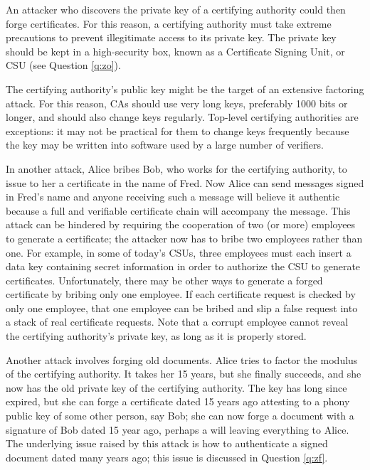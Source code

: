 An attacker who discovers the private key of a certifying authority could 
then forge certificates. For this reason, a certifying authority must take 
extreme precautions to prevent illegitimate access to its private key. The 
private key should be kept in a high-security box, known as a Certificate 
Signing Unit, or CSU (see Question \ref{q:zo}).

The certifying authority's public key might be the target of an extensive 
factoring attack. For this reason, CAs should use very long keys, preferably 
1000 bits or longer, and should also change keys regularly. Top-level 
certifying authorities are exceptions: it may not be practical for them to 
change keys frequently because the key may be written into software used 
by a large number of verifiers.

In another attack, Alice bribes Bob, who works for the certifying authority, 
to issue to her a certificate in the name of Fred. Now Alice can send 
messages signed in Fred's name and anyone receiving such a message will 
believe it authentic because a full and verifiable certificate chain will 
accompany the message. This attack can be hindered by requiring the 
cooperation of two (or more) employees to generate a certificate; the 
attacker now has to bribe two employees rather than one. For example, in 
some of today's CSUs, three employees must each insert a data key containing 
secret information in order to authorize the CSU to generate certificates. 
Unfortunately, there may be other ways to generate a forged certificate by 
bribing only one employee. If each certificate request is checked by only 
one employee, that one employee can be bribed and slip a false request into 
a stack of real certificate requests. Note that a corrupt employee cannot 
reveal the certifying authority's private key, as long as it is properly 
stored.

Another attack involves forging old documents. Alice tries to factor the 
modulus of the certifying authority. It takes her 15 years, but she finally 
succeeds, and she now has the old private key of the certifying authority. 
The key has long since expired, but she can forge a certificate dated 15 
years ago attesting to a phony public key of some other person, say Bob; she 
can now forge a document with a signature of Bob dated 15 year ago, perhaps
a will leaving everything to Alice. The underlying issue raised by this 
attack is how to authenticate a signed document dated many years ago; this 
issue is discussed in Question \ref{q:zf}.

